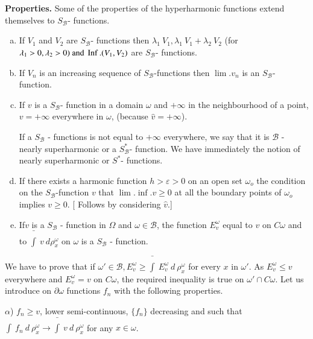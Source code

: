 \section{}\label{p4:chap3:sec12} %

\textbf{Properties.} Some of the properties of the hyperharmonic
functions extend themselves to $S_\mathscr{B}$- functions. 
\begin{enumerate}[a)]
\item If $V_1$ and $V_2$ are $S_\mathscr{B}$- functions then
  $\lambda_1 ~ V_1, \lambda_1 ~ V_1 + \lambda_2 ~ V_2$ (for $\lambda_1
  > 0, \lambda_2 > 0) ~\text{and}~ \operatorname{Inf}. (V_1, V_2)$ are $S_\mathscr{B}$-
  functions. 
\item If $V_n$ is an increasing sequence of $S_\mathscr{B}$-functions
  then $\lim.v_n$ is an $S_\mathscr{B}$- function. 
\item If $v$ is a $S_\mathscr{B}$- function in a domain $\omega$ and
  $+\infty$ in the neighbourhood of a point, $v = + \infty$ everywhere
  in $\omega$, (because $\hat{v} = + \infty$). 

  If a $S_\mathscr{B}$ - functions is not equal to $+ \infty$
  everywhere, we say that it is $\mathscr{B}$ - nearly superharmonic
  or a $S^*_\mathscr{B}$- function. We have immediately the notion of
  nearly superharmonic or $S^*$- functions. 
\item If there exists a harmonic function $h > \varepsilon > 0$ on an
  open set $\omega_o$ the condition on the $S_\mathscr{B}$-function
  $v$ that $\lim.\inf.v \ge 0$ at all the boundary points of
  $\omega_o$ implies $v \ge 0$. [ Follows by considering $\hat{v}$.] 
\item If\pageoriginale $v$ is a $S_\mathscr{B}$ - function in $\Omega$ and $\omega
  \in \mathscr{B}$, the function $E^\omega_v$ equal to $v$ on $C
  \omega$ and to $\bar{\int} ~  v~ d \rho^\omega_x $ on $\omega$ is a
  $S_\mathscr{B}$ - function. 
\end{enumerate}

We have to prove that if $\omega' \in \mathscr{B}, E^\omega_v \ge
\bar{\int} ~ E^\omega_v ~ d ~ \rho^\omega_x$ for every $x$ in
$\omega'$. As $E^\omega_v\leq v $ everywhere and $E^\omega_v = v $ on
$C\omega$, the required inequality is true on $\omega' \cap C
\omega$. Let us introduce on $\partial \omega$ functions $f_n$ with
the following properties. 

$\alpha$) $f_n \ge v$, lower semi-continuous, $\{ f_n\}$ decreasing
and such that $\int ~ f_n ~ d ~ \rho^\omega_x \rightarrow \bar{\int} ~
v ~ d ~ \rho^\omega_x$ for any $x \in \omega$. 

